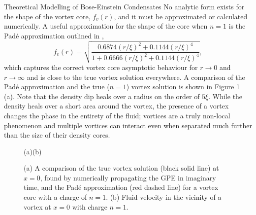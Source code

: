 \begin{chapter}{\label{cha:theoretical_model}Theoretical Modelling of Bose-Einstein Condensates}
No analytic form exists for the shape of the vortex core, $f_v(r)$, and it must be approximated or calculated numerically. A useful approximation for the shape of the core when $n=1$ is the Pad\'e approximation outlined in \cite{berloff2004},
	\begin{equation}
		f_v(r) = \sqrt{\frac{0.6874(r/\xi)^2 + 0.1144(r/\xi)^4}{1+0.6666(r/\xi)^2+0.1144(r/\xi)^4}},
	\end{equation}
which captures the correct vortex core asymptotic behaviour for $r\rightarrow 0$ and $r\rightarrow\infty$ and is close to the true vortex solution everywhere. A comparison of the Pad\'e approximation and the true ($n=1$) vortex solution is shown in Figure \ref{fig_vortex} (a). Note that the density dip heals over a radius on the order of $5\xi$. While the density heals over a short area around the vortex, the presence of a vortex changes the phase in the entirety of the fluid; vortices are a truly non-local phenomenon and multiple vortices can interact even when separated much further than the size of their density cores.

\begin{figure}[!ht]
	\hspace{-0.13\linewidth}(a)\hspace{0.45\linewidth}(b)\hspace{0.03\linewidth}\\
	\centering
  \caption{(a) A comparison of the true vortex solution (black solid line) at $x=0$, found by numerically propagating the GPE in imaginary time, and the Pad\'e approximation (red dashed line) for a vortex core with a charge of $n=1$. (b) Fluid velocity in the vicinity of a vortex at $x=0$ with charge $n=1$.}\label{fig_vortex}
 \end{figure}


\end{chapter}
